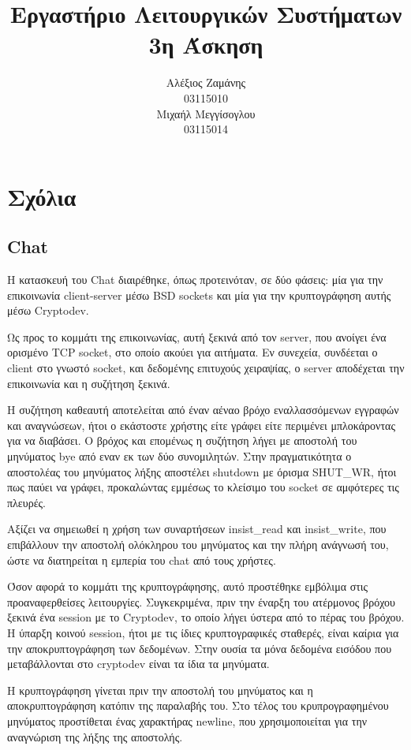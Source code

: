 \documentclass[12pt,titlepage]{article}
\title{Εργαστήριο Λειτουργικών Συστήματων\\
3η Άσκηση}
\author{Αλέξιος Ζαμάνης\\
03115010\\
Μιχαήλ Μεγγίσογλου\\
03115014}
\newcommand{\en}{\textlatin}
\begin{document}
\maketitle

\section{Σχόλια}

\subsection{\en{Chat}}

Η κατασκευή του \en{Chat} διαιρέθηκε, όπως προτεινόταν, σε δύο φάσεις: μία για την επικοινωνία \en{client-server} μέσω \en{BSD sockets} και μία για την κρυπτογράφηση αυτής μέσω \en{Cryptodev}.

Ως προς το κομμάτι της επικοινωνίας, αυτή ξεκινά από τον \en{server}, που ανοίγει ένα ορισμένο \en{TCP socket}, στο οποίο ακούει για αιτήματα. Εν συνεχεία, συνδέεται ο \en{client} στο γνωστό \en{socket}, και δεδομένης επιτυχούς χειραψίας, ο \en{server} αποδέχεται την επικοινωνία και η συζήτηση ξεκινά.

Η συζήτηση καθεαυτή αποτελείται από έναν αέναο βρόχο εναλλασσόμενων εγγραφών και αναγνώσεων, ήτοι ο εκάστοστε χρήστης είτε γράφει είτε περιμένει μπλοκάροντας για να διαβάσει. Ο βρόχος και επομένως η συζήτηση λήγει με αποστολή του μηνύματος \en{bye} από εναν εκ των δύο συνομιλητών. Στην πραγματικότητα ο αποστολέας του μηνύματος λήξης αποστέλει \en{shutdown} με όρισμα \en{SHUT_WR}, ήτοι πως παύει να γράφει, προκαλώντας εμμέσως το κλείσιμο του \en{socket} σε αμφότερες τις πλευρές.

Αξίζει να σημειωθεί η χρήση των συναρτήσεων \en{insist_read} και \en{insist_write}, που επιβάλλουν την αποστολή ολόκληρου του μηνύματος και την πλήρη ανάγνωσή του, ώστε να διατηρείται η εμπερία του \en{chat} από τους χρήστες.

Όσον αφορά το κομμάτι της κρυπτογράφησης, αυτό προστέθηκε εμβόλιμα στις προαναφερθείσες λειτουργίες. Συγκεκριμένα, πριν την έναρξη του ατέρμονος βρόχου ξεκινά ένα \en{session} με το \en{Cryptodev}, το οποίο λήγει ύστερα από το πέρας του βρόχου. Η ύπαρξη κοινού \en{session}, ήτοι με τις ίδιες κρυπτογραφικές σταθερές, είναι καίρια για την αποκρυπτογράφηση των δεδομένων. Στην ουσία τα μόνα δεδομένα εισόδου που μεταβάλλονται στο \en{cryptodev} είναι τα ίδια τα μηνύματα.

Η κρυπτογράφηση γίνεται πριν την αποστολή του μηνύματος και η αποκρυπτογράφηση κατόπιν της παραλαβής του. Στο τέλος του κρυπρογραφημένου μηνύματος προστίθεται ένας χαρακτήρας \en{newline}, που χρησιμοποιείται για την αναγνώριση της λήξης της αποστολής.
\end{document}
